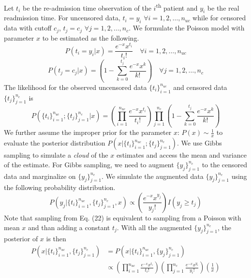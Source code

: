 \documentclass[a4paper, 11pt]{article}
\begin{document}
Let $t_i$ be the re-admission time observation of the $i$\textsuperscript{th} patient and $y_i$ be the real readmission time. For uncensored data, $t_i = y_i$ $\forall i = 1,2,\dots, n_{uc}$ while for censored data with cutoff $c_j$, $t_j = c_j$ $\forall j = 1,2,\dots, n_c$. We formulate the Poisson model with parameter $x$ to be estimated as the following. 
\begin{equation}
P(t_i = y_i|x) = \frac{e^{-x}x^{t_i}}{t_i!} \quad \forall i = 1,2,\dots, n_{uc}
\end{equation}
\begin{equation}
P(t_j = c_j|x) = \left(1 - \sum_{k=0}^{t_j}\frac{e^{-x}x^k}{k!} \right) \quad \forall j = 1,2,\dots, n_{c}
\end{equation}
The likelihood for the observed uncensored data $\{t_i\}_{i=1}^{n_{uc}}$ and censored data $\{t_j\}_{j=1}^{n_{c}}$ is 
\begin{equation}
P(\{t_i\}_{i=1}^{n_{uc}}; \{t_j\}_{j=1}^{n_{c}}|x) = \left(\prod_{i=1}^{n_{uc}}\frac{e^{-x}x^{t_i}}{t_i!} \right)\prod_{j=1}^{n_c}\left( 1 - \sum_{k=0}^{t_j}\frac{e^{-x}x^k}{k!} \right)
\end{equation}
We further assume the improper prior for the parameter $x$: $P(x) \sim \frac{1}{x}$ to evaluate the posterior distribution $P(x|\{t_i\}_{i=1}^{n_{uc}}; \{t_j\}_{j=1}^{n_{c}})$. We use Gibbs sampling to simulate a \textit{cloud} of the $x$ estimates and access the mean and variance of the estimate. For Gibbs sampling, we need to augment $\{y_j \}_{j=1}^{n_c}$ to the censored data and marginalize on $\{y_j \}_{j=1}^{n_c}$. We simulate the augmented data $\{y_j \}_{j=1}^{n_c}$ using the following probability distribution. 
\begin{equation}
P\left(y_j | \{t_i\}_{i=1}^{n_{uc}}, \{t_j\}_{j=1}^{n_{c}}, x \right) \propto \left(\frac{e^{-x}x^{y_j}}{y_j!} \right) I(y_j\geq t_j)
\end{equation}
Note that sampling from Eq. (22) is equivalent to sampling from a Poisson with mean $x$ and than adding a constant $t_j$. With all the augmented $\{y_j \}_{j=1}^{n_c}$, the posterior of $x$ is then
\begin{equation}
\begin{split}
P\left(x| \{t_i\}_{i=1}^{n_{uc}}, \{t_j\}_{j=1}^{n_{c}} \right) & = P\left( x| \{t_i\}_{i=1}^{n_{uc}}, \{y_j\}_{j=1}^{n_{c}} \right) \\
 & \propto \left(\prod_{i=1}^{n_{uc}}\frac{e^{-x}x^{t_i}}{t_i!} \right)\left(\prod_{j=1}^{n_{c}}\frac{e^{-x}x^{y_i}}{y_i!}  \right)\left( \frac{1}{x}\right)
\end{split}
\end{equation}
\end{document}
